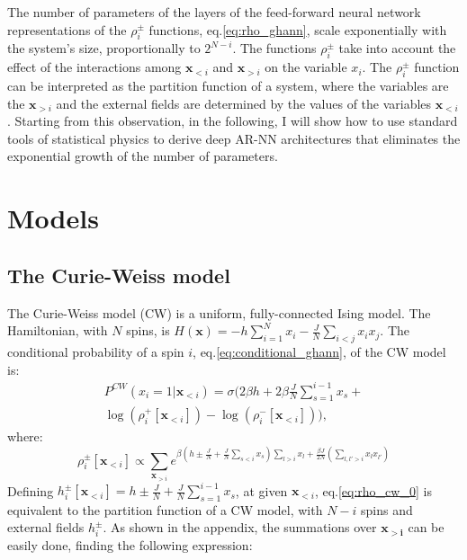 \documentclass[aps,physrev,10pt,floatfix,reprint]{revtex4-2}
\begin{document}
The number of parameters of the layers of the feed-forward neural network representations of the $\rho_i^{\pm}$ functions, eq.\ref{eq:rho_ghann}, scale exponentially with the system's size, proportionally to $2^{N-i}$. 
The functions $\rho_i^{\pm}$ take into account the effect of the interactions among $\mathbf{x}_{<i}$ and $\mathbf{x}_{>i}$ on the variable $x_i$. 
The $\rho_i^{\pm}$ function can be interpreted as the partition function of a system, where the variables are the $\mathbf{x}_{>i}$ and the external fields are determined by the values of the variables $\mathbf{x}_{<i}$.
Starting from this observation, in the following, I will show how to use standard tools of statistical physics to derive deep AR-NN architectures that eliminates the exponential growth of the number of parameters.  \\

\section{Models}
\subsection{The Curie-Weiss model}

The Curie-Weiss model (CW) is a uniform, fully-connected Ising model. The Hamiltonian, with $N$ spins, is $H\left(\mathbf{x}\right)=-h\sum_{i=1}^{N}x_{i}-\frac{J}{N}\sum_{i<j}x_{i}x_{j}$. The conditional probability of a spin $i$, eq.\ref{eq:conditional_ghann}, of the CW model is:
\begin{multline}
P^{CW}\left(x_{i}=1|\mathbf{x}_{<i}\right) = 
\sigma\bigg( 
 2 \beta h + 2 \beta \frac{J}{N}\sum_{s=1}^{i-1}x_{s} + \\
 \log(\rho_i^+[\mathbf{x}_{<i}]) - \log(\rho_i^-[\mathbf{x}_{<i}])
\bigg),
\label{eq:conditional_cw}
\end{multline}
where:
\begin{equation}
\rho_i^{\pm}[\mathbf{x}_{<i}] \propto \sum_{\mathbf{x}_{>i}}e^{\beta \left(h\pm\frac{J}{N}+\frac{J}{N}\sum_{s<i}x_{s}\right)\sum_{l>i}x_{l}+\frac{\beta J}{2N}(\sum_{l,l'>i}x_{l} x_{l'})} 
\label{eq:rho_cw_0}
\end{equation}
Defining $h_i^{\pm}[\mathbf{x}_{<i}] =h\pm\frac{J}{N}+\frac{J}{N}\sum_{s=1}^{i-1}x_{s}$, at given $\mathbf{x}_{<i}$, eq.\ref{eq:rho_cw_0} is equivalent to the partition function of a CW model, with $N-i$ spins and external fields $h_i^{\pm}$. 
As shown in the appendix, the summations over $\mathbf{x_{>i}}$ can be easily done, finding the following expression:
\end{document}
